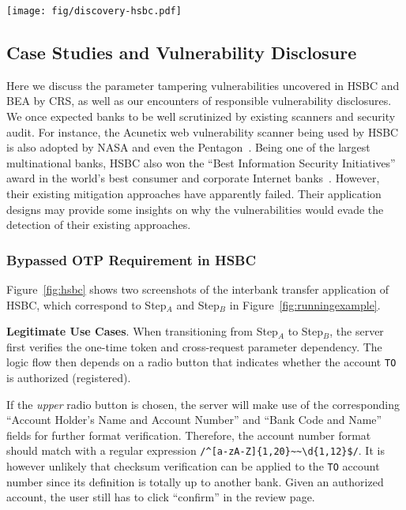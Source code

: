 \documentclass[letter]{sig-alternate-2013}
\begin{document}
\begin{figure*}[tbp]
\centering
\texttt{[image: fig/discovery-hsbc.pdf]}
\caption{The online banking transfer application of HSBC responds with a different review page based on the choice of radio buttons}
\label{fig:hsbc}
\vspace{-0.5em}
\end{figure*}

\subsection{Case Studies and Vulnerability Disclosure}
\label{sec:crs_casestudies}

Here we discuss the parameter tampering vulnerabilities uncovered in HSBC and BEA by CRS, as well as our encounters of responsible vulnerability disclosures. We once expected banks to be well scrutinized by existing scanners and security audit. For instance, the Acunetix web vulnerability scanner being used by HSBC is also adopted by NASA and even the Pentagon~\cite{acunetixwvs}. Being one of the largest multinational banks, HSBC also won the ``Best Information Security Initiatives'' award in the world's best consumer and corporate Internet banks~\cite{hsbcaward}. However, their existing mitigation approaches have apparently failed. Their application designs may provide some insights on why the vulnerabilities would evade the detection of their existing approaches.

\subsubsection{Bypassed OTP Requirement in HSBC}
\label{sec:crs_casestudies_hsbc}

Figure~\ref{fig:hsbc} shows two screenshots of the interbank transfer application of HSBC, which correspond to Step$_A$ and Step$_B$ in Figure~\ref{fig:runningexample}.

\textbf{Legitimate Use Cases}. When transitioning from Step$_A$ to Step$_B$, the server first verifies the one-time token and cross-request parameter dependency. The logic flow then depends on a radio button that indicates whether the account \verb"TO" is authorized (registered).

If the \textit{upper} radio button is chosen, the server will make use of the corresponding ``Account Holder's Name and Account Number'' and ``Bank Code and Name'' fields for further format verification. Therefore, the account number format should match with a regular expression \verb"/^[a-zA-Z]{1,20}~~\d{1,12}$/". It is however unlikely that checksum verification can be applied to the \verb"TO" account number since its definition is totally up to another bank. Given an authorized account, the user still has to click ``confirm'' in the review page. 
\end{document}
